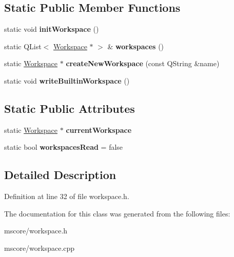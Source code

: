 \subsection*{Static Public Member Functions}
\begin{DoxyCompactItemize}
\item 
\mbox{\label{class_ms_1_1_workspace_aba0b49e8c929c69dacf9c97f38a8f5a3}} 
static void {\bfseries init\+Workspace} ()
\item 
\mbox{\label{class_ms_1_1_workspace_a367f2002749954916eaf692c60575a11}} 
static Q\+List$<$ \hyperlink{class_ms_1_1_workspace}{Workspace} $\ast$ $>$ \& {\bfseries workspaces} ()
\item 
\mbox{\label{class_ms_1_1_workspace_ac48bf23ee00075671dc6f31842c79668}} 
static \hyperlink{class_ms_1_1_workspace}{Workspace} $\ast$ {\bfseries create\+New\+Workspace} (const Q\+String \&name)
\item 
\mbox{\label{class_ms_1_1_workspace_a9f3bf3c644c1b0d7f607e26b51f0bf36}} 
static void {\bfseries write\+Builtin\+Workspace} ()
\end{DoxyCompactItemize}
\subsection*{Static Public Attributes}
\begin{DoxyCompactItemize}
\item 
\mbox{\label{class_ms_1_1_workspace_af51698404dc5563355632bc2dabdd192}} 
static \hyperlink{class_ms_1_1_workspace}{Workspace} $\ast$ {\bfseries current\+Workspace}
\item 
\mbox{\label{class_ms_1_1_workspace_a291a93e6625c7cd95c0c8620e8f6e6f3}} 
static bool {\bfseries workspaces\+Read} = false
\end{DoxyCompactItemize}


\subsection{Detailed Description}


Definition at line 32 of file workspace.\+h.



The documentation for this class was generated from the following files\+:\begin{DoxyCompactItemize}
\item 
mscore/workspace.\+h\item 
mscore/workspace.\+cpp\end{DoxyCompactItemize}
